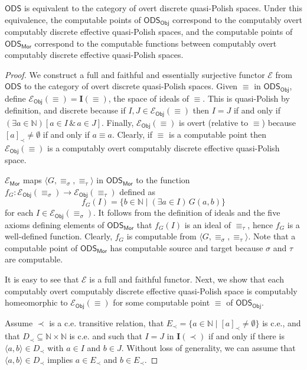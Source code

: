 \documentclass[envcountsame]{llncs}
\def\IN{{\mathbb N}}
\def\calE{{\mathcal{E}}}
\def\I#1{{{\mathrm{\mathbf I}}(#1)}}
\newcommand{\cntSets}{{\mathsf{ODS}}}
\newcommand{\Mor}{\mathsf{Mor}}
\newcommand{\Obj}{\mathsf{Obj}}
\def\src{{\sigma}}
\def\tar{{\tau}}
\begin{document}
\begin{theorem}
$\cntSets$ is equivalent to the category of overt discrete quasi-Polish spaces. Under this equivalence, the computable points of $\cntSets_\Obj$ correspond to the computably overt computably discrete effective quasi-Polish spaces, and the computable points of $\cntSets_\Mor$ correspond to the computable functions between computably overt computably discrete effective quasi-Polish spaces.
\end{theorem}
\begin{proof}
We construct a full and faithful and essentially surjective functor $\calE$ from $\cntSets$ to the category of overt discrete quasi-Polish spaces. 
Given $\equiv$ in $\cntSets_\Obj$, define $\calE_\Obj(\equiv)=\I{\equiv}$, the space of ideals of $\equiv$.  This is quasi-Polish by definition, and discrete because if $I,J\in \calE_\Obj(\equiv)$ then $I = J$ if and only if $(\exists a\in \IN)[a\in I \,\&\, a\in J]$. Finally, $\calE_\Obj(\equiv)$ is overt (relative to $\equiv$) because $[a]_\prec\not = \emptyset$ if and only if $a\equiv a$. Clearly, if $\equiv$ is a computable point then $\calE_\Obj(\equiv)$ is a computably overt computably discrete effective quasi-Polish space.

$\calE_\Mor$ maps $\langle G, \equiv_\src, \equiv_\tar \rangle$ in $\cntSets_\Mor$ to the function $f_G\colon \calE_\Obj(\equiv_\src)\to \calE_\Obj(\equiv_\tar)$ defined as
\[f_G(I) = \{b\in \IN \mid (\exists a\in I)\, G(a,b)\}\]
for each $I\in \calE_\Obj(\equiv_\src)$. It follows from the definition of ideals and the five axioms defining elements of  $\cntSets_\Mor$ that $f_G(I)$ is an ideal of $\equiv_\tar$, hence $f_G$ is a well-defined function. Clearly, $f_G$ is computable from $\langle G, \equiv_\src, \equiv_\tar \rangle$. Note that a computable point of $\cntSets_\Mor$ has computable source and target because $\src$ and $\tar$ are computable.


It is easy to see that $\calE$ is a full and faithful functor. Next, we show that each computably overt computably discrete effective quasi-Polish space is computably homeomorphic to $\calE_\Obj(\equiv)$ for some computable point $\equiv$ of $\cntSets_\Obj$. 

Assume $\prec$ is a c.e. transitive relation, that $E_\prec=\{ a\in\IN \mid [a]_\prec\not=\emptyset\}$ is c.e., and that $D_\prec \subseteq \IN\times\IN$ is c.e. and such that $I = J$ in $\I{\prec}$ if and only if there is $\langle a,b\rangle\in D_\prec$ with $a \in I$ and $b \in J$. Without loss of generality, we can assume that $\langle a,b\rangle\in D_\prec$ implies $a\in E_\prec$ and $b\in E_\prec$.


\end{proof}
\end{document}
